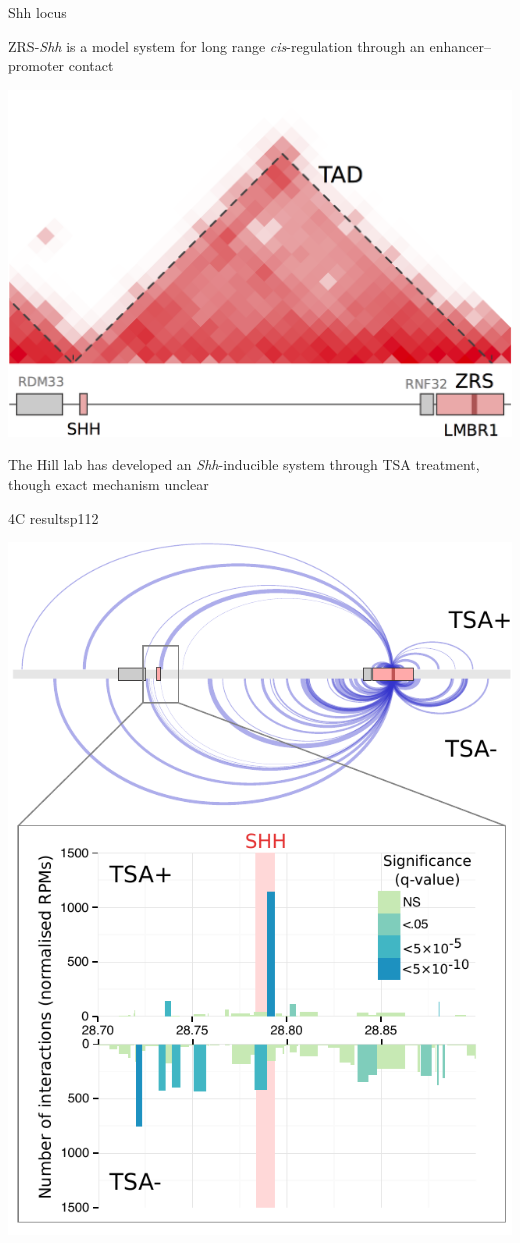 \documentclass{beamer}
\begin{document}
\begin{frame}{Shh locus}

ZRS-\emph{Shh} is a model system for long range \emph{cis}-regulation through an enhancer--promoter contact

\vspace{1em}

\centerline{
\includegraphics[width=.7\textwidth]{../figs/shhtad.png} 
} 

The Hill lab has developed an \emph{Shh}-inducible system through TSA treatment, though exact mechanism unclear

\end{frame}

\begin{frame}{4C results}{p112}

\centering
\includegraphics[width=.55\textwidth]{../figs/shharc_full.pdf} 

\end{frame}
\end{document}
